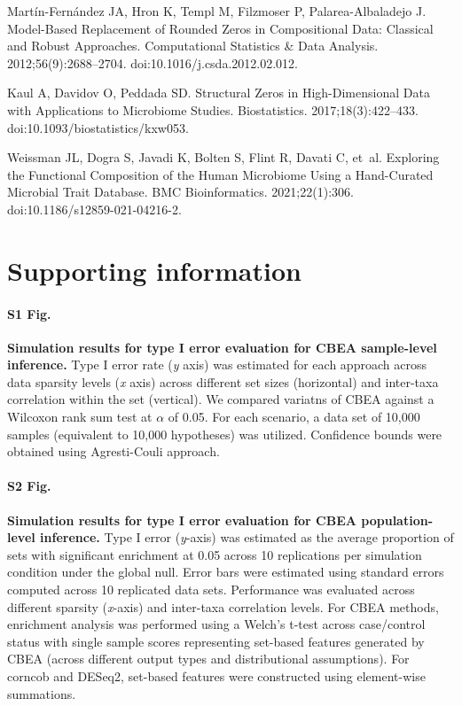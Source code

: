 \documentclass[10pt,letterpaper]{article}
\begin{document}
\begin{thebibliography}{10}
{Mart{\'i}n-Fern{\'a}ndez} JA, Hron K, Templ M, Filzmoser P,
  {Palarea-Albaladejo} J.
\newblock Model-Based Replacement of Rounded Zeros in Compositional Data:
  {{Classical}} and Robust Approaches.
\newblock Computational Statistics \& Data Analysis. 2012;56(9):2688--2704.
\newblock doi:{10.1016/j.csda.2012.02.012}.

Kaul A, Davidov O, Peddada SD.
\newblock Structural Zeros in High-Dimensional Data with Applications to
  Microbiome Studies.
\newblock Biostatistics. 2017;18(3):422--433.
\newblock doi:{10.1093/biostatistics/kxw053}.

Weissman JL, Dogra S, Javadi K, Bolten S, Flint R, Davati C, et~al.
\newblock Exploring the Functional Composition of the Human Microbiome Using a
  Hand-Curated Microbial Trait Database.
\newblock BMC Bioinformatics. 2021;22(1):306.
\newblock doi:{10.1186/s12859-021-04216-2}.

\end{thebibliography}


\section*{Supporting information}

\paragraph*{S1 Fig.}
\label{S1_Fig}
{\bf Simulation results for type I error evaluation for CBEA sample-level inference.} Type I error rate (\emph{y} axis) was estimated for each approach across data sparsity levels (\emph{x} axis) across different set sizes (horizontal) and inter-taxa correlation within the set (vertical). We compared variatns of CBEA against a Wilcoxon rank sum test at $\alpha$ of 0.05. For each scenario, a data set of 10,000 samples (equivalent to 10,000 hypotheses) was utilized. Confidence bounds were obtained using Agresti-Couli approach.

\paragraph*{S2 Fig.}
\label{S2_Fig}
{\bf Simulation results for type I error evaluation for CBEA population-level inference.} Type I error (\emph{y}-axis) was estimated as the average proportion of sets with significant enrichment at 0.05 across 10 replications per simulation condition under the global null. Error bars were estimated using standard errors computed across 10 replicated data sets. Performance was evaluated across different sparsity (\emph{x}-axis) and inter-taxa correlation levels. For CBEA methods, enrichment analysis was performed using a Welch's t-test across case/control status with single sample scores representing set-based features generated by CBEA (across different output types and distributional assumptions). For corncob and DESeq2, set-based features were constructed using element-wise summations.
\end{document}

